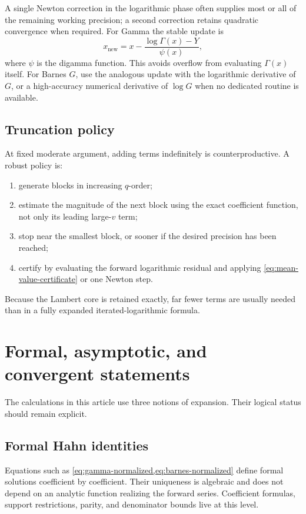 \documentclass[11pt,oneside]{article}
\theoremstyle{plain}
\theoremstyle{definition}
\theoremstyle{remark}
\begin{document}
A single Newton correction in the logarithmic phase often supplies most or all
of the remaining working precision; a second correction retains quadratic
convergence when required.  For Gamma the stable update is
\begin{equation}
 x_{\mathrm{new}}=x-
 \frac{\log\Gamma(x)-Y}{\psi(x)},
 \label{eq:gamma-newton-log}
\end{equation}
where \(\psi\) is the digamma function.  This avoids overflow from evaluating
\(\Gamma(x)\) itself.  For Barnes \(G\), use the analogous update with the
logarithmic derivative of \(G\), or a high-accuracy numerical derivative of
\(\log G\) when no dedicated routine is available.

\subsection{Truncation policy}

At fixed moderate argument, adding terms indefinitely is counterproductive.
A robust policy is:
\begin{enumerate}
\item generate blocks in increasing \(q\)-order;
\item estimate the magnitude of the next block using the exact coefficient
      function, not only its leading large-\(v\) term;
\item stop near the smallest block, or sooner if the desired precision has
      been reached;
\item certify by evaluating the forward logarithmic residual and applying
      \cref{eq:mean-value-certificate} or one Newton step.
\end{enumerate}
Because the Lambert core is retained exactly, far fewer terms are usually
needed than in a fully expanded iterated-logarithmic formula.

\section{Formal, asymptotic, and convergent statements}
\label{sec:logical-status}

The calculations in this article use three notions of expansion.  Their
logical status should remain explicit.

\subsection{Formal Hahn identities}

Equations such as \cref{eq:gamma-normalized,eq:barnes-normalized} define
formal solutions coefficient by coefficient.  Their uniqueness is algebraic
and does not depend on an analytic function realizing the forward series.
Coefficient formulas, support restrictions, parity, and denominator bounds
live at this level.
\end{document}
